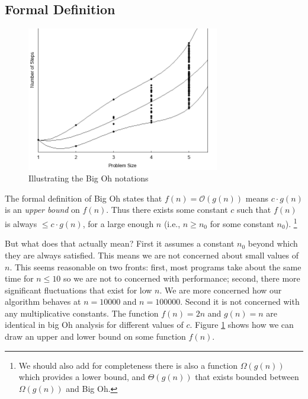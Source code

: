 	\subsection{Formal Definition}
		\begin{figure}[t]
			\centering
			\includegraphics[width=0.75\textwidth]{./assets/imgs/bigOcomplexity.png}
			\caption{\label{fig:bigOdefiniton} Illustrating the Big Oh notations}
		\end{figure}
		The formal definition of Big Oh states that	$f(n) = \mathcal{O}(g(n))$ means $c \cdot g(n)$ is an \textit{upper bound} on $f(n)$. Thus there exists some constant $c$ such that $f(n)$ is always $\le c \cdot g(n)$, for a large enough $n$ (i.e., $n \ge n_0$ for some constant $n_0$). \footnote{We should also add for completeness there is also a function $\Omega(g(n))$ which provides a lower bound, and $\Theta(g(n))$ that exists bounded between $\Omega(g(n))$ and Big Oh.}
		
		But what does that actually mean? First it assumes a constant $n_0$ beyond which they are always satisfied. This means we are not concerned about small values of $n$. This seems reasonable on two fronts: first, most programs take about the same time for $n\le10$ so we are not to concerned with performance; second, there more significant fluctuations that exist for low $n$. We are more concerned how our algorithm behaves at $n=\num{10000}$ and $n=\num{100000}$. Second it is not concerned with any multiplicative constants. The function $f(n) = 2n$ and $g(n) = n$ are identical in big Oh analysis for different values of $c$. Figure \ref{fig:bigOdefiniton} shows how we can draw an upper and lower bound on some function $f(n)$. 
		
